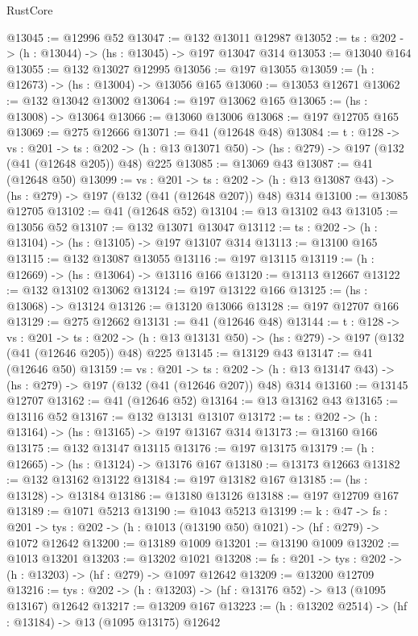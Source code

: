 \begin{lexlean}{RustCore}
\begin{coremodule}
@13045 := @12996 @52
@13047 := @132 @13011 @12987
@13052 := {ts : @202} -> (h : @13044) -> (hs : @13045) -> @197 @13047 @314
@13053 := @13040 @164
@13055 := @132 @13027 @12995
@13056 := @197 @13055
@13059 := (h : @12673) -> (hs : @13004) -> @13056 @165
@13060 := @13053 @12671
@13062 := @132 @13042 @13002
@13064 := @197 @13062 @165
@13065 := (hs : @13008) -> @13064
@13066 := @13060 @13006
@13068 := @197 @12705 @165
@13069 := @275 @12666
@13071 := @41 (@12648 @48)
@13084 := {t : @128} ->
  {vs : @201} ->
  {ts : @202} -> (h : @13 @13071 @50) -> (hs : @279) -> @197 (@132 (@41 (@12648 @205)) @48) @225
@13085 := @13069 @43
@13087 := @41 (@12648 @50)
@13099 := {vs : @201} ->
  {ts : @202} -> (h : @13 @13087 @43) -> (hs : @279) -> @197 (@132 (@41 (@12648 @207)) @48) @314
@13100 := @13085 @12705
@13102 := @41 (@12648 @52)
@13104 := @13 @13102 @43
@13105 := @13056 @52
@13107 := @132 @13071 @13047
@13112 := {ts : @202} -> (h : @13104) -> (hs : @13105) -> @197 @13107 @314
@13113 := @13100 @165
@13115 := @132 @13087 @13055
@13116 := @197 @13115
@13119 := (h : @12669) -> (hs : @13064) -> @13116 @166
@13120 := @13113 @12667
@13122 := @132 @13102 @13062
@13124 := @197 @13122 @166
@13125 := (hs : @13068) -> @13124
@13126 := @13120 @13066
@13128 := @197 @12707 @166
@13129 := @275 @12662
@13131 := @41 (@12646 @48)
@13144 := {t : @128} ->
  {vs : @201} ->
  {ts : @202} -> (h : @13 @13131 @50) -> (hs : @279) -> @197 (@132 (@41 (@12646 @205)) @48) @225
@13145 := @13129 @43
@13147 := @41 (@12646 @50)
@13159 := {vs : @201} ->
  {ts : @202} -> (h : @13 @13147 @43) -> (hs : @279) -> @197 (@132 (@41 (@12646 @207)) @48) @314
@13160 := @13145 @12707
@13162 := @41 (@12646 @52)
@13164 := @13 @13162 @43
@13165 := @13116 @52
@13167 := @132 @13131 @13107
@13172 := {ts : @202} -> (h : @13164) -> (hs : @13165) -> @197 @13167 @314
@13173 := @13160 @166
@13175 := @132 @13147 @13115
@13176 := @197 @13175
@13179 := (h : @12665) -> (hs : @13124) -> @13176 @167
@13180 := @13173 @12663
@13182 := @132 @13162 @13122
@13184 := @197 @13182 @167
@13185 := (hs : @13128) -> @13184
@13186 := @13180 @13126
@13188 := @197 @12709 @167
@13189 := @1071 @5213
@13190 := @1043 @5213
@13199 := {k : @47} ->
  {fs : @201} -> {tys : @202} -> (h : @1013 (@13190 @50) @1021) -> (hf : @279) -> @1072 @12642
@13200 := @13189 @1009
@13201 := @13190 @1009
@13202 := @1013 @13201
@13203 := @13202 @1021
@13208 := {fs : @201} -> {tys : @202} -> (h : @13203) -> (hf : @279) -> @1097 @12642
@13209 := @13200 @12709
@13216 := {tys : @202} -> (h : @13203) -> (hf : @13176 @52) -> @13 (@1095 @13167) @12642
@13217 := @13209 @167
@13223 := (h : @13202 @2514) -> (hf : @13184) -> @13 (@1095 @13175) @12642

\end{coremodule}
\end{lexlean}

